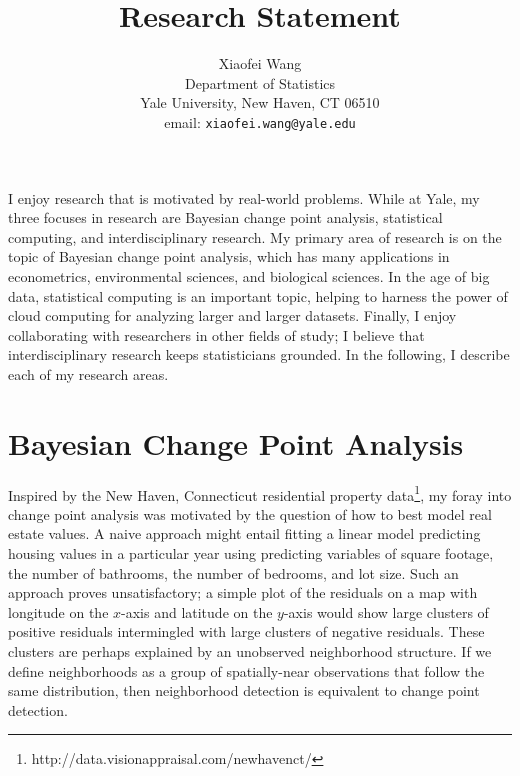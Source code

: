 \documentclass[11pt]{article}
\begin{document}
\title{Research Statement}
\author{Xiaofei Wang\\
Department of Statistics \\ 
Yale University, New Haven, CT 06510  \\ 
email: \texttt{xiaofei.wang@yale.edu} }

\maketitle
I enjoy research that is motivated by real-world problems. While at Yale, my three focuses in research are Bayesian change point analysis, statistical computing, and interdisciplinary research. My primary area of research is on the topic of Bayesian change point analysis, which has many applications in econometrics, environmental sciences, and biological sciences. In the age of big data, statistical computing is an important topic, helping to harness the power of cloud computing for analyzing larger and larger datasets. Finally, I enjoy collaborating with researchers in other fields of study; I believe that interdisciplinary research keeps statisticians grounded. In the following, I describe each of my research areas.

\section{Bayesian Change Point Analysis} %
\label{sec:bayesian_change_point_analysis}
 Inspired by the New Haven, Connecticut residential property data\footnote{http://data.visionappraisal.com/newhavenct/}, my foray into change point analysis was motivated by the question of how to best model real estate values. A naive approach might entail fitting a linear model predicting housing values in a particular year using predicting variables of square footage, the number of bathrooms, the number of bedrooms, and lot size. Such an approach proves unsatisfactory; a simple plot of the residuals on a map with longitude on the $x$-axis and latitude on the $y$-axis would show large clusters of positive residuals intermingled with large clusters of negative residuals. These clusters are perhaps explained by an unobserved neighborhood structure. If we define neighborhoods as a group of spatially-near observations that follow the same distribution, then neighborhood detection is equivalent to change point detection. 
\end{document}
